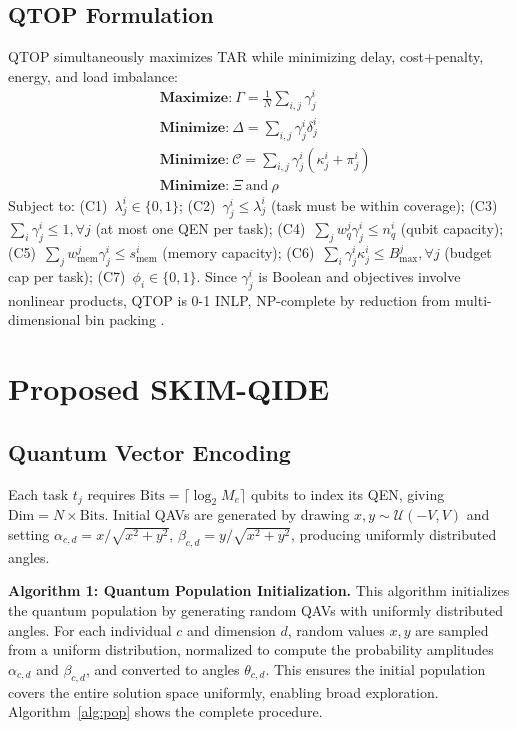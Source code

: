\documentclass[10pt,twocolumn]{article}
\begin{document}
\subsection{QTOP Formulation}
QTOP simultaneously maximizes TAR while minimizing delay, cost+penalty, energy, and load imbalance:
\begin{align}
&\textbf{Maximize:}\ \Gamma=\tfrac{1}{N}\textstyle\sum_{i,j}\gamma^i_j\label{eq:obj1}\\
&\textbf{Minimize:}\ \Delta=\textstyle\sum_{i,j}\gamma^i_j\delta^i_j\label{eq:obj2}\\
&\textbf{Minimize:}\ \mathcal{C}=\textstyle\sum_{i,j}\gamma^i_j(\kappa^i_j+\pi^i_j)\label{eq:obj3}\\
&\textbf{Minimize:}\ \Xi\ \text{and}\ \rho\label{eq:obj4}
\end{align}
Subject to: (C1)~$\lambda^i_j\in\{0,1\}$; (C2)~$\gamma^i_j\le\lambda^i_j$ (task must be within coverage); (C3)~$\sum_i\gamma^i_j\le1,\forall j$ (at most one QEN per task); (C4)~$\sum_j w^j_q\gamma^i_j\le n^i_q$ (qubit capacity); (C5)~$\sum_j w^j_{\mathrm{mem}}\gamma^i_j\le s^i_{\mathrm{mem}}$ (memory capacity); (C6)~$\sum_i\gamma^i_j\kappa^i_j\le B^j_{\mathrm{max}},\forall j$ (budget cap per task); (C7)~$\phi_i\in\{0,1\}$. Since $\gamma^i_j$ is Boolean and objectives involve nonlinear products, QTOP is 0-1 INLP, NP-complete by reduction from multi-dimensional bin packing \cite{ref6}.

\section{Proposed SKIM-QIDE}

\subsection{Quantum Vector Encoding}
Each task $t_j$ requires $\mathrm{Bits}=\lceil\log_2 M_e\rceil$ qubits to index its QEN, giving $\mathrm{Dim}=N\times\mathrm{Bits}$. Initial QAVs are generated by drawing $x,y\sim\mathcal{U}(-V,V)$ and setting $\alpha_{c,d}=x/\sqrt{x^2+y^2}$, $\beta_{c,d}=y/\sqrt{x^2+y^2}$, producing uniformly distributed angles.

\textbf{Algorithm 1: Quantum Population Initialization.}
This algorithm initializes the quantum population by generating random QAVs with uniformly distributed angles. For each individual $c$ and dimension $d$, random values $x,y$ are sampled from a uniform distribution, normalized to compute the probability amplitudes $\alpha_{c,d}$ and $\beta_{c,d}$, and converted to angles $\theta_{c,d}$. This ensures the initial population covers the entire solution space uniformly, enabling broad exploration. Algorithm~\ref{alg:pop} shows the complete procedure.
\end{document}
